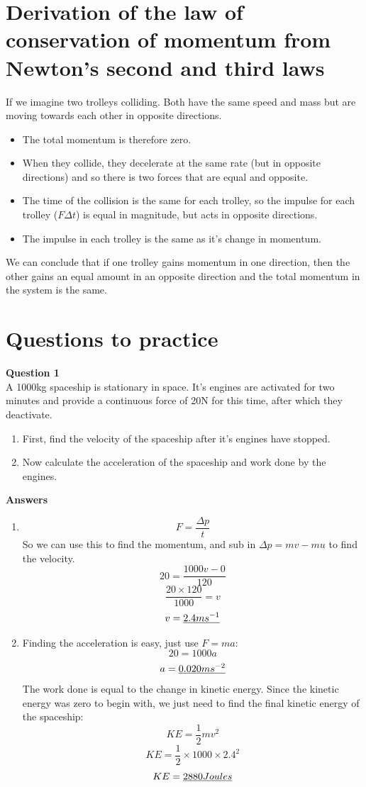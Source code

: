 \documentclass{article}
\begin{document}
\section*{Derivation of the law of conservation of momentum from Newton's second and third laws}
If we imagine two trolleys colliding. Both have the same speed and mass but are moving towards each other in opposite directions. 
\begin{itemize}
	\item The total momentum is therefore zero.
	\item When they collide, they decelerate at the same rate (but in opposite directions) and so there is two forces that are equal and opposite.
	\item The time of the collision is the same for each trolley, so the impulse for each trolley ($F \Delta t$) is equal in magnitude, but acts in opposite directions.
	\item The impulse in each trolley is the same as it's change in momentum.
\end{itemize}

We can conclude that if one trolley gains momentum in one direction, then the other gains an equal amount in an opposite direction and the total momentum in the system is the same.

\section*{Questions to practice}
\textbf{Question 1}\\
A 1000kg spaceship is stationary in space. It's engines are activated for two minutes and provide a continuous force of 20N for this time, after which they deactivate.

\begin{enumerate}
	\item First, find the velocity of the spaceship after it's engines have stopped.
	\item Now calculate the acceleration of the spaceship and work done by the engines.
	
\end{enumerate}

\noindent
\textbf{Answers}
\begin{enumerate}
	\item \[
		F = \frac{\Delta p}{t}
		\]
		So we can use this to find the momentum, and sub in $\Delta p = mv - mu$ to find the velocity.
		\[
			20 = \frac{1000v - 0}{120}
		\]
		\[
			\frac{20 \times 120}{1000} = v
		\]
		\[
			v = \uline{2.4ms^{-1}}
		\]
	\item Finding the acceleration is easy, just use $F = ma$:
	\[
		20 = 1000a
	\]
	\[
		a = \uline{0.020ms^{-2}}
	\]
	The work done is equal to the change in kinetic energy. Since the kinetic energy was zero to begin with, we just need to find the final kinetic energy of the spaceship:
	\[
		KE = \frac{1}{2}mv^2
	\]
	\[
		KE = \frac{1}{2} \times 1000 \times 2.4^2
	\]
	\[
		KE = \uline{2880 Joules}
	\]
\end{enumerate}
\end{document}
